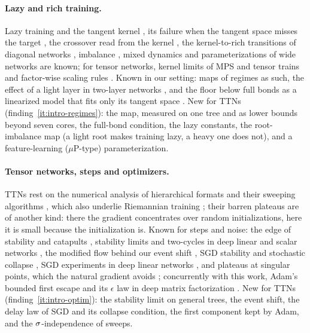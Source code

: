 \paragraph{Lazy and rich training.} Lazy training and the tangent kernel
\citep{jacot2018neural,chizat2019lazy,lee2019wide}, its failure when the tangent space misses the target
\citep{ghorbani2019limitations}, the crossover read from the kernel \citep{geiger2020disentangling,
bordelon2022selfconsistent}, the kernel-to-rich transitions of diagonal networks
\citep{woodworth2020kernel,pesme2023saddletosaddle,berthier2023incremental}, imbalance
\citep{kunin2024get,domine2025lazy}, mixed dynamics \citep{tu2024mixed,lyu2024dichotomy} and
parameterizations of wide networks \citep{yang2021tensor,yang2024spectral} are known; for tensor networks,
kernel limits of MPS and tensor trains \citep{guo2021neural,wesel2025tensor} and factor-wise scaling
rules \citep{qiu2024compute,potapczynski2024searching}. Known in our setting: maps of regimes as such, the
effect of a light layer in two-layer networks \citep{kunin2024get,domine2025lazy}, and the floor below full
bonds as a linearized model that fits only its tangent space \citep{chizat2019lazy,ghorbani2019limitations}.
New for TTNs (finding~\ref{it:intro-regimes}): the map, measured on one tree and as lower bounds beyond seven
cores, the full-bond condition, the lazy constants, the root-imbalance map (a light root makes training
lazy, a heavy one does not), and a feature-learning
($\mu$P-type) parameterization.

\paragraph{Tensor networks, steps and optimizers.} TTNs rest on the numerical analysis of hierarchical
formats and their sweeping algorithms
\citep{hackbusch2009new,grasedyck2010hierarchical,oseledets2011tensor,holtz2012manifolds,%
uschmajew2013geometry,holtz2012alternating,white1992density}, which also underlie Riemannian training
\citep{novikov2018exponential,steinlechner2016riemannian}; their barren plateaus
\citep{liu2022presence,miao2024isometric,barthel2025absence} are of another kind: there the gradient
concentrates over random initializations, here it is small because the initialization is. Known for
steps and noise: the edge of stability and catapults \citep{cohen2021gradient,lewkowycz2020large},
stability limits and two-cycles in deep linear and scalar networks
\citep{mulayoff2020unique,kreisler2023gradient,ghosh2025learning,macdonald2025convergence}, the modified
flow behind our event shift \citep{barrett2021implicit}, SGD stability and stochastic collapse
\citep{li2017stochastic,mulayoff2024exact,chen2023stochastic}, SGD experiments in deep linear networks
\citep{corlouer2026stochastic}, and plateaus at singular points, which the natural gradient avoids
\citep{amari2006singularities}; concurrently with this work, Adam's bounded first escape and its $\epsilon$
law in deep matrix factorization \citep{sabanayagam2026optimizer}. New for TTNs
(finding~\ref{it:intro-optim}): the stability limit on general trees, the event shift, the delay law of
SGD and its collapse condition, the first component kept by Adam, and the $\sigma$-independence of sweeps.

